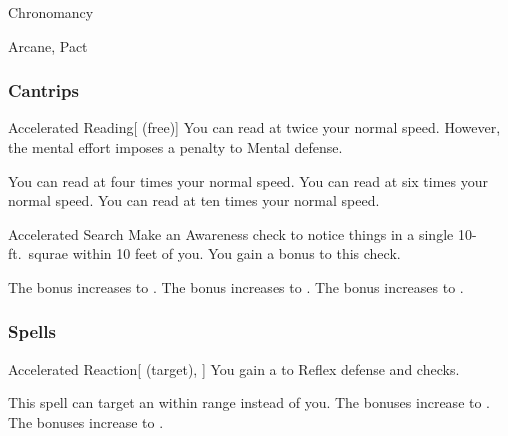 \newpage
\begin{spellsection}{Chronomancy}

\begin{spellheader}
\end{spellheader}


 Arcane, Pact

\subsubsection{Cantrips}


\begin{freeability}{Accelerated Reading}[ (free)]
You can read at twice your normal speed.
However, the mental effort imposes a  penalty to Mental defense.

\rankline
{} You can read at four times your normal speed.
 You can read at six times your normal speed.
 You can read at ten times your normal speed.
\end{freeability}


\begin{freeability}{Accelerated Search}
Make an Awareness check to notice things in a single 10-ft.\ squrae within 10 feet of you.
You gain a  bonus to this check.

\rankline
{} The bonus increases to .
 The bonus increases to .
 The bonus increases to .
\end{freeability}

\end{spellsection}


\subsubsection{Spells}


\lowercase{\hypertarget{spell:Accelerated Reaction}{}}\label{spell:Accelerated Reaction}
\begin{attuneability}[Rank 1]{\hypertarget{spell:Accelerated Reaction}{Accelerated Reaction}}[ (target), ]
You gain a   to Reflex defense and  checks.

\rankline
{} This spell can target an  within \rngmed range instead of you.
 The bonuses increase to .
 The bonuses increase to .

\end{attuneability}
\vspace{0.25em}



